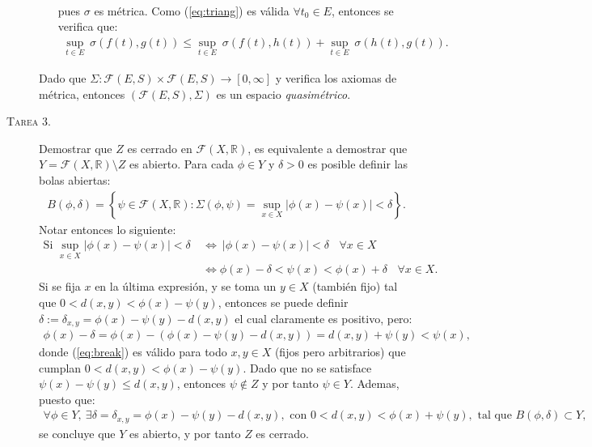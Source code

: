 \documentclass[spanish, fleqn]{article}
\begin{document}
\begin{description}
\begin{enumerate}
\begin{align}
         \label{eq:triang}
         \end{align}
         pues $\sigma$ es métrica. Como (\ref{eq:triang}) es válida $\forall t_0 \in E$, entonces se verifica que:
         \begin{align*}
             \sup_{t\in E} \ \sigma\left(f(t), g(t) \right) \leq \sup_{t\in E} \ \sigma\left(f(t), h(t) \right) + \sup_{t\in E} \ \sigma\left(h(t), g(t) \right).
         \end{align*}
    \end{enumerate}
    Dado que $\Sigma: \mathcal{F}(E,S) \times \mathcal{F}(E,S) \rightarrow [0,\infty]$ y verifica los axiomas de métrica, entonces $\left(\mathcal{F}(E,S), \Sigma \right)$ es un espacio \textit{quasimétrico}.



    \item[\textsc{Tarea 3.}] Demostrar que $Z$ es cerrado en $\mathcal{F}(X,\mathbb{R})$, es equivalente a demostrar que $ Y = \mathcal{F}(X,\mathbb{R}) \setminus Z$ es abierto. Para cada $\phi \in Y$ y $\delta >0$ es posible definir las bolas abiertas:
    \begin{align*}
        B(\phi, \delta) = \left\{ \psi \in \mathcal{F}(X,\mathbb{R}): \Sigma(\phi,\psi) = \sup_{x \in X} |\phi(x)-\psi(x)| < \delta \right\}.
    \end{align*}
    Notar entonces lo siguiente:
    \begin{align*}
        \text{Si } \sup_{x \in X} |\phi(x)-\psi(x)| < \delta \ &\Leftrightarrow \ |\phi(x)-\psi(x)| < \delta \ \ \ \ \forall x \in X \\
        & \Leftrightarrow \phi(x)-\delta < \psi(x) < \phi(x)+\delta \ \ \ \ \forall x \in X.
    \end{align*}
    Si se fija $x$ en la última expresión, y se toma un $y \in X$ (también fijo) tal que $0 < d(x,y) <  \phi(x) - \psi(y)$, entonces se puede definir $\delta := \delta_{x,y} = \phi(x) - \psi(y) - d(x,y)$ el cual claramente es positivo, pero:
    \begin{align}
        \phi(x) - \delta = \phi(x) - (\phi(x) - \psi(y) - d(x,y) ) = d(x,y) + \psi(y) < \psi(x),
    \label{eq:break}
    \end{align}
    donde (\ref{eq:break}) es válido para todo $x,y \in X$ (fijos pero arbitrarios) que cumplan $0 < d(x,y) <  \phi(x) - \psi(y)$. Dado que no se satisface $\psi(x)-\psi(y) \leq d(x,y)$, entonces $\psi \notin Z$ y por tanto $\psi \in Y$. Ademas, puesto que:
    \begin{align*}
        \forall \phi \in Y, \ \exists \delta = \delta_{x,y} = \phi(x) - \psi(y) - d(x,y), \text{ con } 0 < d(x,y) <  \phi(x) + \psi(y), \text{ tal que } B(\phi, \delta) \subset Y, 
    \end{align*}
     se concluye que $Y$ es abierto, y por tanto $Z$ es cerrado. 






\end{description}
\end{document}
